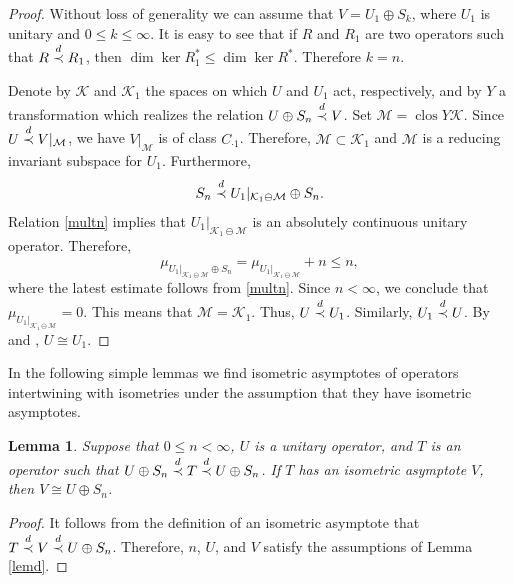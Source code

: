 \documentclass[a4paper,oneside,11pt]{amsart}
\numberwithin{equation}{section}
\theoremstyle{plain}
\newtheorem{lemma}[theorem]{Lemma}
\theoremstyle{definition}
\begin{document}
\begin{proof} 
  Without loss of generality we can assume that $V=U_1\oplus S_k$, where $U_1$ is unitary and $0\leq k\leq\infty$.
It is easy to see that  if $R$ and $R_1$ are two operators such that $R\buildrel d \over\prec R_1$, then 
$\dim\ker R_1^*\leq \dim\ker R^*$.
Therefore  $k=n$. 
 
Denote by $\mathcal K$ and $\mathcal K_1$ the spaces on which $U$ and $U_1$ act, respectively, 
and by $Y$ a transformation which realizes the relation $U\oplus S_n\buildrel d \over\prec   V$.  
  Set $\mathcal M=\operatorname{clos}Y\mathcal K$. Since $U\buildrel d \over\prec V|_{\mathcal M}$, we have 
$V|_{\mathcal M}$ is of class  $C_{\cdot 1}$. Therefore, $\mathcal M\subset\mathcal  K_1$ and  
 $\mathcal M$ is a reducing invariant subspace for $U_1$. 
Furthermore, 
\begin{equation}\label{multn}S_n\buildrel d \over\prec U_1|_{\mathcal K_1\ominus \mathcal M}\oplus S_n.\end{equation} 
Relation \eqref{multn} implies that $U_1|_{\mathcal K_1\ominus \mathcal M}$ is an absolutely continuous unitary operator.  Therefore, 
 $$\mu_{U_1|_{\mathcal K_1\ominus \mathcal M}\oplus S_n}=\mu_{U_1|_{\mathcal K_1\ominus \mathcal M}}+n\leq n,$$
where the latest estimate follows from \eqref{multn}.  
Since $n<\infty$, we conclude that $\mu_{U_1|_{\mathcal K_1\ominus \mathcal M}}=0$. This means that $\mathcal M=\mathcal K_1$. Thus, $U\buildrel d \over\prec U_1$. Similarly, $U_1\buildrel d \over\prec U$.  By 
{\cite[Proposition II.3.4]{nfbk}} and {\cite[Proposition II.10.6 and Lemma II.13.6]{conway}}, $U\cong U_1$. 
\end{proof}

In the following simple lemmas we find  isometric asymptotes of operators intertwining with isometries 
under the assumption that they have isometric asymptotes.

\begin{lemma}\label{lemfinite} Suppose that $0\leq n<\infty$, $U$ is a unitary operator, and $T$ is an operator 
such that $U\oplus S_n\buildrel d \over\prec  T\buildrel d \over\prec  U\oplus S_n$. 
 If $T$ has an isometric asymptote $V$, then $V\cong U\oplus S_n$. 
\end{lemma}

\begin{proof} It follows from the definition of an isometric asymptote that 
$T\buildrel d \over\prec   V\buildrel d \over\prec  U\oplus S_n$. 
Therefore, $n$, $U$, and $V$ satisfy the assumptions of Lemma \ref{lemd}.
\end{proof}
\end{document}
